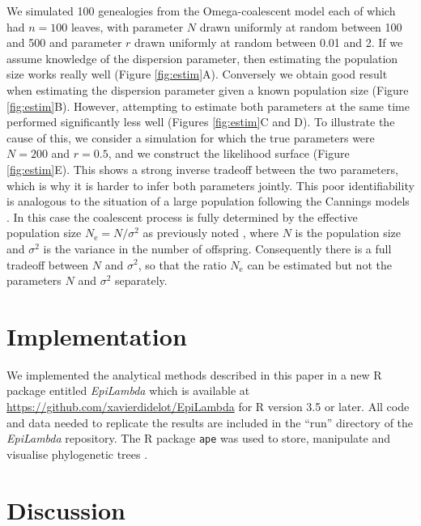 \documentclass{article}
\begin{document}
We simulated 100 genealogies from the Omega-coalescent model each of which had
$n=100$ leaves, with parameter $N$ drawn uniformly at random between 100 and 500
and parameter $r$ drawn uniformly at random between 0.01 and 2.
If we assume knowledge of the dispersion parameter, then estimating the population size 
works really well (Figure \ref{fig:estim}A). Conversely we obtain good result when 
estimating the dispersion parameter given a known population size 
(Figure \ref{fig:estim}B). However, attempting to estimate both parameters at the same
time performed significantly less well (Figures \ref{fig:estim}C and D). 
To illustrate the cause of this, we consider a simulation for which the true 
parameters were $N=200$ and $r=0.5$, 
and we construct the likelihood surface (Figure \ref{fig:estim}E).
This shows a strong inverse tradeoff between the two parameters, which is
why it is harder to infer both parameters jointly.
This poor identifiability is analogous to the situation of a large population following 
the Cannings models \citep{Cannings1974}. In this case the 
coalescent process is fully determined by the effective population size 
$N_\mathrm{e}=N/\sigma^2$ as previously noted \citep{Kingman1982}, where $N$ is the 
population size and $\sigma^2$ is the variance in the number of offspring. Consequently
there is a full tradeoff between $N$ and $\sigma^2$, so that the ratio $N_\mathrm{e}$
can be estimated but not the parameters $N$ and $\sigma^2$ separately.

\section{Implementation}

We implemented the analytical methods described in this paper in a 
new R package entitled \emph{EpiLambda} which is available
at \url{https://github.com/xavierdidelot/EpiLambda} for R version 3.5 or later. 
All code and data needed to replicate the results are included in the ``run'' directory of the \emph{EpiLambda} repository.
The R package \verb+ape+ was used to store, manipulate and visualise phylogenetic trees
\citep{Paradis2019}.

\section{Discussion}
\end{document}
